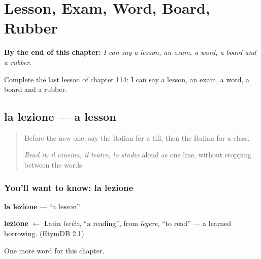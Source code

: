
\chapter{Lesson, Exam, Word, Board, Rubber}
\label{ch:it-lesson-exam-word-board-rubber}

\begin{chapteropening}
\textbf{By the end of this chapter:} \emph{I can say a lesson, an exam, a word, a board and a rubber.}

Complete the last lesson of chapter 114: I can say a lesson, an exam, a word, a board and a rubber.
\end{chapteropening}

\section[la lezione]{la lezione — a lesson}

\label{lesson:IT-C114-lezione}



\begin{quote}
Before the new one: say the Italian for a till, then the Italian for a class.

\emph{Read it:} \emph{il cinema, il teatro, lo stadio} aloud as one line, without stopping between the words
\end{quote}

\subsection*{You'll want to know: la lezione}
\textbf{la lezione} — \textquotedblleft{}a lesson\textquotedblright{}.

\begin{cousinweb}
\textbf{lezione} $\leftarrow$ Latin \emph{lectio}, \textquotedblleft{}a reading\textquotedblright{}, from \emph{legere}, \textquotedblleft{}to read\textquotedblright{} — a learned borrowing. (EtymDB 2.1)
\end{cousinweb}

\begin{grammarlens}[title={What you've built}]
One more word for this chapter.
\end{grammarlens}

